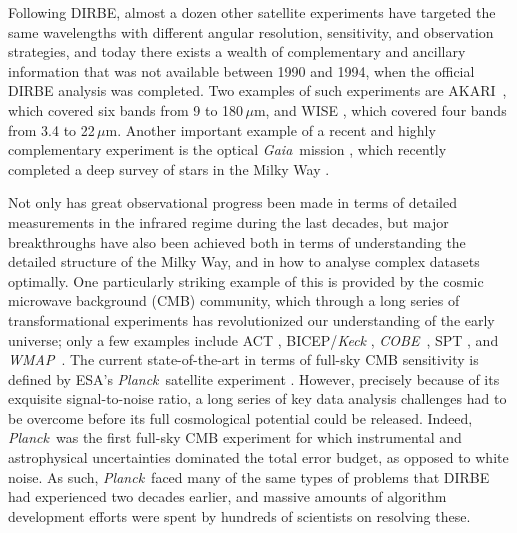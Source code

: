 \documentclass{aa}
\def\Planck{\textit{Planck}}
\def\WMAP{\textit{WMAP}}
\def\COBE{\textit{COBE}}
\def\GAIA{\textit{Gaia}}
\def\AKARI{\textrm{{AKARI}}}
\begin{document}
Following DIRBE, almost a dozen other satellite experiments have targeted the same wavelengths with different angular resolution, sensitivity, and observation strategies, and today there exists a wealth of complementary and ancillary information that was not available between 1990 and 1994, when the official DIRBE analysis was completed. Two examples of such experiments are \AKARI\ \citep{murakami:2007}, which covered six bands from 9 to 180\,$\mu$m, and WISE \citep{wright:2010}, which covered four bands from 3.4 to 22\,$\mu$m. Another important example of a recent and highly complementary experiment is the optical \GAIA\ mission \citep{gaia:2016}, which recently completed a deep survey of stars in the Milky Way \citep{gaia:2018}.

Not only has great observational progress been made in terms of detailed measurements in the infrared regime during the last decades, but major breakthroughs have also been achieved both in terms of understanding the detailed structure of the Milky Way, and in how to analyse complex datasets optimally. One particularly striking example of this is provided by the cosmic microwave background (CMB) community, which through a long series of transformational experiments has revolutionized our understanding of the early universe; only a few examples include ACT \citep{fowler:2007}, BICEP/\textit{Keck} \citep{2014ApJ...792...62B}, \COBE\ \citep{mather:1994}, SPT \citep{carlstrom:2011}, and \WMAP\ \citep{bennett2012}. The current state-of-the-art in terms of full-sky CMB sensitivity is defined by ESA's \Planck\ satellite experiment \citep{planck2016-l01}. However, precisely because of its exquisite signal-to-noise ratio, a long series of key data analysis challenges had to be overcome before its full cosmological potential could be released. Indeed, \Planck\ was the first full-sky CMB experiment for which instrumental and astrophysical uncertainties dominated the total error budget, as opposed to white noise. As such, \Planck\ faced many of the same types of problems that DIRBE had experienced two decades earlier, and massive amounts of algorithm development efforts were spent by hundreds of scientists on resolving these.
\end{document}
